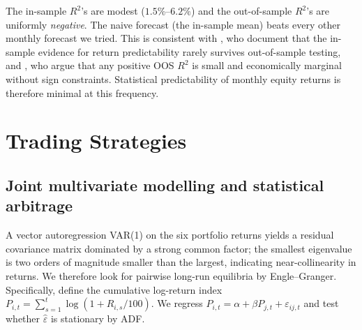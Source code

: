 \documentclass[11pt,a4paper]{article}
\begin{document}
The in-sample $R^2$'s are modest ($1.5\%$--$6.2\%$) and the out-of-sample $R^2$'s are uniformly \emph{negative}. The naive forecast (the in-sample mean) beats every other monthly forecast we tried. This is consistent with \citet{WelchGoyal2008}, who document that the in-sample evidence for return predictability rarely survives out-of-sample testing, and \citet{CampbellThompson2008}, who argue that any positive OOS $R^2$ is small and economically marginal without sign constraints. Statistical predictability of monthly equity returns is therefore minimal at this frequency.

\section{Trading Strategies}

\subsection{Joint multivariate modelling and statistical arbitrage}
A vector autoregression VAR(1) on the six portfolio returns yields a residual covariance matrix dominated by a strong common factor; the smallest eigenvalue is two orders of magnitude smaller than the largest, indicating near-collinearity in returns. We therefore look for pairwise long-run equilibria by Engle--Granger. Specifically, define the cumulative log-return index $P_{i,t} = \sum_{s=1}^{t} \log(1 + R_{i,s}/100)$. We regress $P_{i,t} = \alpha + \beta P_{j,t} + \varepsilon_{ij,t}$ and test whether $\hat\varepsilon$ is stationary by ADF.
\end{document}
